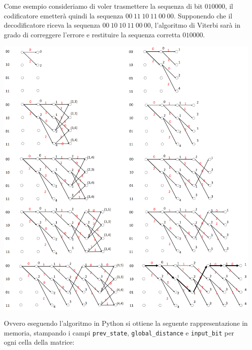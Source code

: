 Come esempio consideriamo di voler trasmettere la sequenza di bit $010000$, il codificatore emetterà quindi la sequenza $00 \ 11 \ 10 \ 11 \ 00 \ 00$. Supponendo che il decodificatore riceva la sequenza $00 \ 10 \ 10 \ 11 \ 00 \ 00$, l'algoritmo di Viterbi sarà in grado di correggere l'errore e restituire la sequenza corretta $010000$.




\begin{center}
    \includegraphics[width=1\textwidth]{imgs/viterbi_example.png}
\end{center}


Ovvero eseguendo l'algoritmo in Python si ottiene la seguente rappresentazione in memoria, stampando i campi \texttt{prev\_state}, \texttt{global\_distance} e \texttt{input\_bit} per ogni cella della matrice:


